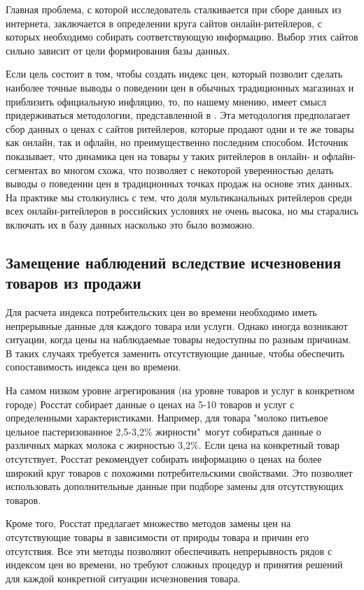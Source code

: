 Главная проблема, с которой исследователь сталкивается при сборе данных из интернета, заключается в определении круга сайтов онлайн-ритейлеров, с которых необходимо собирать соответствующую информацию. Выбор этих сайтов сильно зависит от цели формирования базы данных. 

Если цель состоит в том, чтобы создать индекс цен, который позволит сделать наиболее точные выводы о поведении цен в обычных традиционных магазинах и приблизить официальную инфляцию, то, по нашему мнению, имеет смысл придерживаться методологии, представленной в \cite{cavallo2016billion}. Эта методология предполагает сбор данных о ценах с сайтов ритейлеров, которые продают одни и те же товары как онлайн, так и офлайн, но преимущественно последним способом. Источник \cite{cavallo2016online} показывает, что динамика цен на товары у таких ритейлеров в онлайн- и офлайн-сегментах во многом схожа, что позволяет с некоторой уверенностью делать выводы о поведении цен в традиционных точках продаж на основе этих данных. На практике мы столкнулись с тем, что доля мультиканальных ритейлеров среди всех онлайн-ритейлеров в российских условиях не очень высока, но мы старались включать их в базу данных насколько это было возможно.

\subsection{Замещение наблюдений вследствие исчезновения товаров из продажи }\label{subsec:ch2/sec2/sub2}

Для расчета индекса потребительских цен во времени необходимо иметь непрерывные данные для каждого товара или услуги. Однако иногда возникают ситуации, когда цены на наблюдаемые товары недоступны по разным причинам. В таких случаях требуется заменить отсутствующие данные, чтобы обеспечить сопоставимость индекса цен во времени.

На самом низком уровне агрегирования (на уровне товаров и услуг в конкретном городе) Росстат собирает данные о ценах на 5-10 товаров и услуг с определенными характеристиками. Например, для товара "молоко питьевое цельное пастеризованное 2,5-3,2\% жирности"~могут собираться данные о различных марках молока с жирностью 3,2\%. Если цена на конкретный товар отсутствует, Росстат рекомендует собирать информацию о ценах на более широкий круг товаров с похожими потребительскими свойствами. Это позволяет использовать дополнительные данные при подборе замены для отсутствующих товаров.

Кроме того, Росстат предлагает множество методов замены цен на отсутствующие товары в зависимости от природы товара и причин его отсутствия. Все эти методы позволяют обеспечивать непрерывность рядов с индексом цен во времени, но требуют сложных процедур и принятия решений для каждой конкретной ситуации исчезновения товара.

